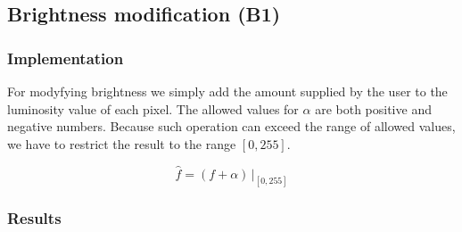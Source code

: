 \documentclass[12pt]{article}
\begin{document}
\vspace{5em}
\subsection{Brightness modification (B1)}

\subsubsection{Implementation}

For modyfying brightness we simply add the amount supplied by the user to the luminosity value of each pixel.
The allowed values for $\alpha$ are both positive and negative numbers.
Because such operation can exceed the range of allowed values, we have to restrict the result to the range $[0,255]$.

\begin{equation}
    \hat{f} = (f + \alpha) \, \Big|_{[0,255]}
\end{equation}

\subsubsection{Results}
\end{document}
